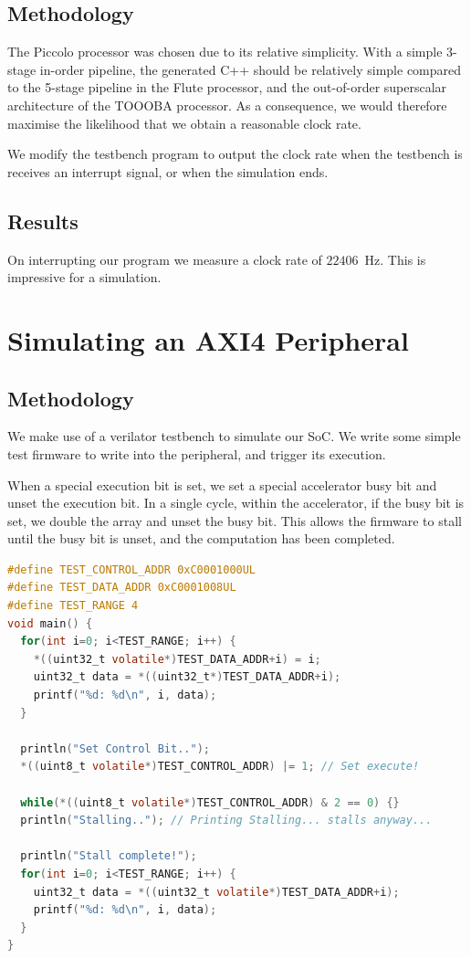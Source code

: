 \documentclass[a4paper,8pt]{report}
\begin{document}
\subsection{Methodology}
The Piccolo processor was chosen due to its relative simplicity. With a simple
3-stage in-order pipeline, the generated C++ should be relatively simple
compared to the 5-stage pipeline in the Flute processor, and the out-of-order
superscalar architecture of the TOOOBA processor. As a consequence, we would
therefore maximise the likelihood that we obtain a reasonable clock rate.

We modify the testbench program to output the clock rate when the testbench is
receives an interrupt signal, or when the simulation ends. 

\subsection{Results}
On interrupting our program we measure a clock rate of $22406$~Hz. This is impressive for a simulation.

\section{Simulating an AXI4 Peripheral}
\subsection{Methodology}
We make use of a verilator testbench to simulate our SoC. We write some simple
test firmware to write into the peripheral, and trigger its execution.

When a special execution bit is set, we set a special accelerator busy bit and
unset the execution bit. In a single cycle, within the accelerator, if the
busy bit is set, we double the array and unset the busy bit. This allows the
firmware to stall until the busy bit is unset, and the computation has been
completed.

\begin{lstlisting}[language=C,style=customc]
#define TEST_CONTROL_ADDR 0xC0001000UL
#define TEST_DATA_ADDR 0xC0001008UL
#define TEST_RANGE 4
void main() {
  for(int i=0; i<TEST_RANGE; i++) {
    *((uint32_t volatile*)TEST_DATA_ADDR+i) = i;
    uint32_t data = *((uint32_t*)TEST_DATA_ADDR+i);
    printf("%d: %d\n", i, data);
  }

  println("Set Control Bit..");
  *((uint8_t volatile*)TEST_CONTROL_ADDR) |= 1; // Set execute!

  while(*((uint8_t volatile*)TEST_CONTROL_ADDR) & 2 == 0) {}
  println("Stalling.."); // Printing Stalling... stalls anyway...

  println("Stall complete!");
  for(int i=0; i<TEST_RANGE; i++) {
    uint32_t data = *((uint32_t volatile*)TEST_DATA_ADDR+i);
    printf("%d: %d\n", i, data);
  }
}
\end{lstlisting}
\end{document}
